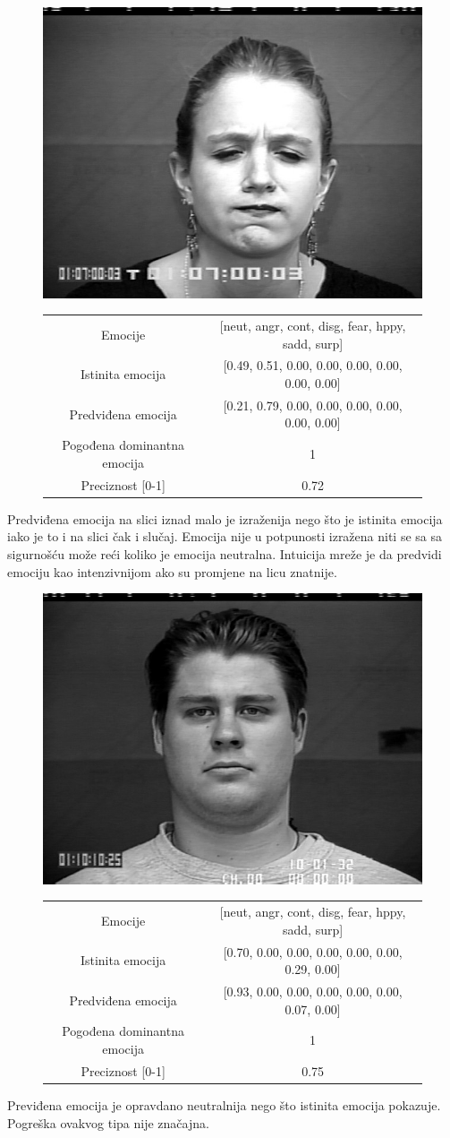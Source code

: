 \documentclass[times, utf8, zavrsni,numeric,pstricks]{fer}
\begin{document}
\begin{figure}[H]
\centering
		\includegraphics[width=0.3\linewidth, keepaspectratio]{S055_004_00000015.png}
		\begin{tabular}
					{|c|c|}\hline
					Emocije & [neut, angr, cont, disg, fear, hppy, sadd, surp]\\
					Istinita emocija & [0.49, 0.51, 0.00, 0.00, 0.00, 0.00, 0.00, 0.00]\\
					Predviđena emocija	& [0.21, 0.79, 0.00, 0.00, 0.00, 0.00, 0.00, 0.00]\\
					Pogođena dominantna emocija & 1\\
					Preciznost [0-1] & 0.72\\
					\hline
		\end{tabular}
\end{figure}

Predviđena emocija na slici iznad malo je izraženija nego što je istinita emocija iako je to i na slici čak i slučaj. Emocija nije u potpunosti izražena niti se sa sa sigurnošću može reći koliko je emocija neutralna. Intuicija mreže je da predvidi emociju kao intenzivnijom ako su promjene na licu znatnije.

\begin{figure}[H]
\centering
		\includegraphics[width=0.3\linewidth, keepaspectratio]{S132_002_00000006.png}
		\begin{tabular}
					{|c|c|}\hline
					Emocije & [neut, angr, cont, disg, fear, hppy, sadd, surp]\\
					Istinita emocija & [0.70, 0.00, 0.00, 0.00, 0.00, 0.00, 0.29, 0.00]\\
					Predviđena emocija	& [0.93, 0.00, 0.00, 0.00, 0.00, 0.00, 0.07, 0.00]\\
					Pogođena dominantna emocija & 1\\
					Preciznost [0-1] & 0.75\\
					\hline
		\end{tabular}
\end{figure}
Previđena emocija je opravdano neutralnija nego što istinita emocija pokazuje. Pogreška ovakvog tipa nije značajna.
\end{document}

